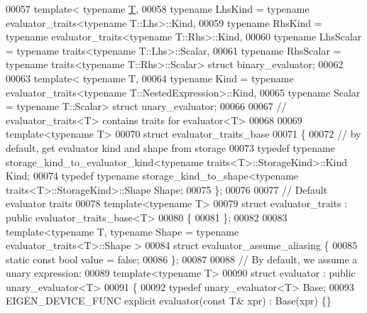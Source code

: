 \begin{DoxyCode}
00057 \textcolor{keyword}{template}< \textcolor{keyword}{typename} \hyperlink{group___sparse_core___module_class_eigen_1_1_triplet}{T},
00058           \textcolor{keyword}{typename} LhsKind   = \textcolor{keyword}{typename} evaluator\_traits<typename T::Lhs>::Kind,
00059           \textcolor{keyword}{typename} RhsKind   = \textcolor{keyword}{typename} evaluator\_traits<typename T::Rhs>::Kind,
00060           \textcolor{keyword}{typename} LhsScalar = \textcolor{keyword}{typename} traits<typename T::Lhs>::Scalar,
00061           \textcolor{keyword}{typename} RhsScalar = \textcolor{keyword}{typename} traits<typename T::Rhs>::Scalar> \textcolor{keyword}{struct }binary\_evaluator;
00062 
00063 \textcolor{keyword}{template}< \textcolor{keyword}{typename} T,
00064           \textcolor{keyword}{typename} Kind   = \textcolor{keyword}{typename} evaluator\_traits<typename T::NestedExpression>::Kind,
00065           \textcolor{keyword}{typename} Scalar = \textcolor{keyword}{typename} T::Scalar> \textcolor{keyword}{struct }unary\_evaluator;
00066           
00067 \textcolor{comment}{// evaluator\_traits<T> contains traits for evaluator<T> }
00068 
00069 \textcolor{keyword}{template}<\textcolor{keyword}{typename} T>
00070 \textcolor{keyword}{struct }evaluator\_traits\_base
00071 \{
00072   \textcolor{comment}{// by default, get evaluator kind and shape from storage}
00073   \textcolor{keyword}{typedef} \textcolor{keyword}{typename} storage\_kind\_to\_evaluator\_kind<typename traits<T>::StorageKind>::Kind Kind;
00074   \textcolor{keyword}{typedef} \textcolor{keyword}{typename} storage\_kind\_to\_shape<typename traits<T>::StorageKind>::Shape Shape;
00075 \};
00076 
00077 \textcolor{comment}{// Default evaluator traits}
00078 \textcolor{keyword}{template}<\textcolor{keyword}{typename} T>
00079 \textcolor{keyword}{struct }evaluator\_traits : \textcolor{keyword}{public} evaluator\_traits\_base<T>
00080 \{
00081 \};
00082 
00083 template<typename T, typename Shape = typename evaluator\_traits<T>::Shape >
00084 \textcolor{keyword}{struct }evaluator\_assume\_aliasing \{
00085   \textcolor{keyword}{static} \textcolor{keyword}{const} \textcolor{keywordtype}{bool} value = \textcolor{keyword}{false};
00086 \};
00087 
00088 \textcolor{comment}{// By default, we assume a unary expression:}
00089 \textcolor{keyword}{template}<\textcolor{keyword}{typename} T>
00090 \textcolor{keyword}{struct }evaluator : \textcolor{keyword}{public} unary\_evaluator<T>
00091 \{
00092   \textcolor{keyword}{typedef} unary\_evaluator<T> Base;
00093   EIGEN\_DEVICE\_FUNC \textcolor{keyword}{explicit} evaluator(\textcolor{keyword}{const} T& xpr) : Base(xpr) \{\}

\end{DoxyCode}
